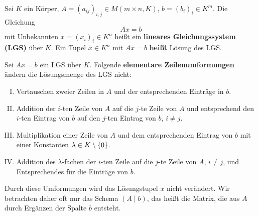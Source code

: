 \setcounter{definition}{6}
\begin{definition}
	\label{def:I.3.7}
	Sei $K$ ein Körper, $A = (a_{ij})_{i,j} \in M(m\times n, K)$, $b = (b_i)_i \in K^m$. Die Gleichung
	\[
		Ax = b
	\]
	mit Unbekannten $x = (x_i)_i \in K^n$ heißt ein \textbf{lineares Gleichungssystem (LGS)} über $K$.
	Ein Tupel $\tilde{x} \in K^n$ mit $A\tilde{x} = b$ \textbf{heißt} Lösung des LGS. 
\end{definition}

\setcounter{definition}{8}
\begin{definition}
	\label{def:I.3.9}
	Sei $Ax = b$ ein LGS über $K$.
	Folgende \textbf{elementare Zeilenumformungen} ändern die Lösungsmenge des LGS nicht: 
	\begin{enumerate}[(I)]
		\item Vertauschen zweier Zeilen in $A$ und der entsprechenden Einträge in $b$.
		\item Addition der $i$-ten Zeile von $A$ auf die $j$-te Zeile von $A$ und entsprechend den $i$-ten Eintrag von $b$ auf den $j$-ten Eintrag von $b$, $i \neq j$.
		\item Multiplikation einer Zeile von $A$ und dem entsprechenden Eintrag von $b$ mit einer Konstanten $\lambda \in K \setminus \{0\}$.
		\item Addition des $\lambda$-fachen der $i$-ten Zeile auf die $j$-te Zeile von $A$, $i \neq j$, und Entsprechendes für die Einträge von $b$.
	\end{enumerate}
\end{definition}

Durch diese Umformungen wird das Lösungstupel $x$ nicht verändert.
Wir betrachten daher oft nur das Schema $(A \mid b)$, das heißt die Matrix, die aus $A$ durch Ergänzen der Spalte $b$ entsteht.

